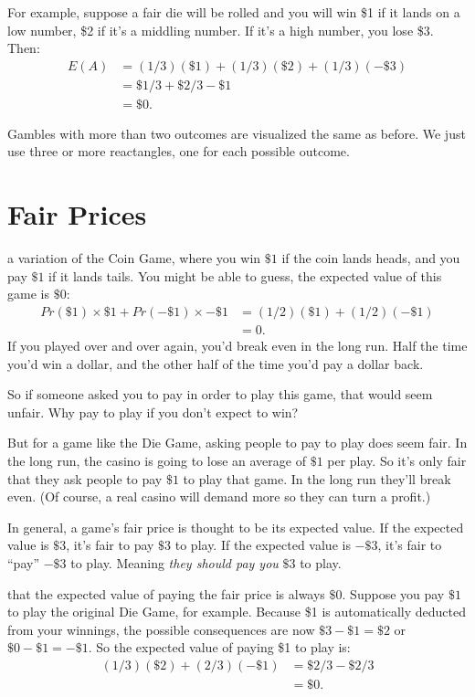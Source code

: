 \documentclass[justified]{tufte-book}
\newcommand{\p}{Pr}
\newcommand{\E}{E}
\theoremstyle{definition}
\theoremstyle{definition}
\theoremstyle{definition}
\theoremstyle{remark}
\begin{document}
For example, suppose a fair die will be rolled and you will win \$1 if
it lands on a low number, \$2 if it's a middling number. If it's a high
number, you lose \$3. Then: \[
  \begin{aligned}
    \E(A) &= (1/3)(\$1) + (1/3)(\$2) + (1/3)(-\$3)\\
          &= \$1/3 + \$2/3 - \$1\\
          &= \$0.
  \end{aligned}
\]

Gambles with more than two outcomes are visualized the same as before.
We just use three or more reactangles, one for each possible outcome.

\hypertarget{fair-prices}{%
\section{Fair Prices}\label{fair-prices}}

 a variation of the Coin Game, where you win \(\$1\)
if the coin lands heads, and you pay \(\$1\) if it lands tails. You
might be able to guess, the expected value of this game is \(\$0\): \[
  \begin{aligned}
    \p(\$1) \times \$1 + \p(-\$1) \times -\$1 &= (1/2)(\$1) + (1/2)(-\$1)\\
      &= 0.
  \end{aligned}
\] If you played over and over again, you'd break even in the long run.
Half the time you'd win a dollar, and the other half of the time you'd
pay a dollar back.

So if someone asked you to pay in order to play this game, that would
seem unfair. Why pay to play if you don't expect to win?

But for a game like the Die Game, asking people to pay to play does seem
fair. In the long run, the casino is going to lose an average of \(\$1\)
per play. So it's only fair that they ask people to pay \(\$1\) to play
that game. In the long run they'll break even. (Of course, a real casino
will demand more so they can turn a profit.)

In general, a game's fair price is thought to be its expected value. If
the expected value is \(\$3\), it's fair to pay \(\$3\) to play. If the
expected value is \(-\$3\), it's fair to ``pay'' \(-\$3\) to play.
Meaning \emph{they should pay you} \(\$3\) to play.

 that the expected value of paying the fair price is
always \(\$0\). Suppose you pay \(\$1\) to play the original Die Game,
for example. Because \$1 is automatically deducted from your winnings,
the possible consequences are now \(\$3 - \$1 = \$2\) or
\(\$0 - \$1 = -\$1\). So the expected value of paying \$1 to play is: \[
  \begin{aligned}
    (1/3)(\$2) + (2/3)(-\$1) &= \$2/3 - \$2/3\\
      &= \$0.
  \end{aligned}
\]
\end{document}
